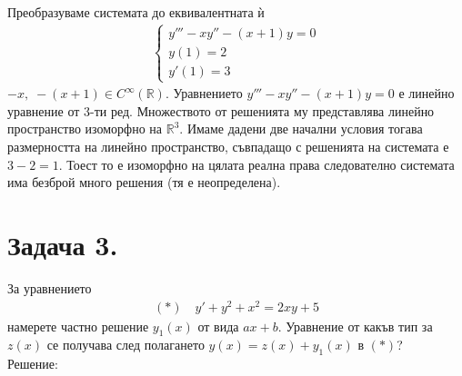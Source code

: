 \documentclass[a4paper, 12pt, oneside]{article}
\newcommand{\R}{\mathbb{R}}
\begin{document}
Преобразуваме системата до еквивалентната ѝ
\begin{align*}
    \begin{cases}
        y''' - xy'' - (x + 1)y = 0\\
        y(1) = 2 \\
        y'(1) = 3
    \end{cases}
\end{align*}
$-x, \; -(x + 1) \in C^\infty(\R)$.
Уравнението $y''' - xy'' - (x + 1)y = 0$ е линейно уравнение от 3-ти ред.
Множеството от решенията му представлява линейно пространство изоморфно на $\R^3$.
Имаме дадени две начални условия тогава размерността на линейно пространство,
съвпадащо с решенията на системата е $3 - 2 = 1$. Тоест то е изоморфно на цялата
реална права следователно системата има безброй много решения (тя е неопределена).

\section{Задача 3.}
За уравнението \begin{align*}
    (*) \quad y' + y^2 + x^2 = 2xy + 5
\end{align*}
намерете частно решение $y_1(x)$ от вида $ax + b$.
Уравнение от какъв тип за $z(x)$ се получава след полагането
$y(x) = z(x) + y_1(x)$ в $(*)$? \\

Решение: \\
\end{document}
